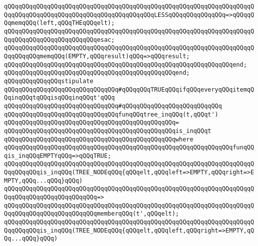 \verb|qQQqqQQqqQQqqQQqqQQqqQQqqQQqqQQqqQQqqQQqqQQqqQQqqQQqqQQqqQQqqQQqqQQqqQQqqQQqqQQqqQQqqQQqqQQqqQQqqQQqqQQqqQQqqQQqLESSqQQqqQQqqQQqqQQq=>qQQqqQQqmemqQQq(left,qQQqTHEqQQqelt);|\newline
\verb|qQQqqQQqqQQqqQQqqQQqqQQqqQQqqQQqqQQqqQQqqQQqqQQqqQQqqQQqqQQqqQQqqQQqqQQqqQQqqQQqqQQqqQQqqQQqqQQqesac;|\newline
\newline
\verb|qQQqqQQqqQQqqQQqqQQqqQQqqQQqqQQqqQQqqQQqqQQqqQQqqQQqqQQqqQQqqQQqqQQqqQQqqQQqqQQqmemqQQq(EMPTY,qQQqresult)qQQq=>qQQqresult;|\newline
\verb|qQQqqQQqqQQqqQQqqQQqqQQqqQQqqQQqqQQqqQQqqQQqqQQqqQQqqQQqqQQqqQQqend;|\newline
\verb|qQQqqQQqqQQqqQQqqQQqqQQqqQQqqQQqqQQqqQQqqQQqqQQqend;|\newline
\newline
\verb|qQQqqQQqqQQqqQQqstipulate|\newline
\newline
\verb|qQQqqQQqqQQqqQQqqQQqqQQqqQQqqQQq#qQQqqQQqTRUEqQQqifqQQqeveryqQQqitemqQQqinqQQqtqQQqisqQQqinqQQqt'qQQq|\newline
\verb|qQQqqQQqqQQqqQQqqQQqqQQqqQQqqQQq#qQQqqQQqqQQqqQQqqQQqqQQqqQQq|\newline
\verb|qQQqqQQqqQQqqQQqqQQqqQQqqQQqqQQqfunqQQqtree_inqQQq(t,qQQqt')|\newline
\verb|qQQqqQQqqQQqqQQqqQQqqQQqqQQqqQQqqQQqqQQqqQQqqQQq=|\newline
\verb|qQQqqQQqqQQqqQQqqQQqqQQqqQQqqQQqqQQqqQQqqQQqqQQqis_inqQQqt|\newline
\verb|qQQqqQQqqQQqqQQqqQQqqQQqqQQqqQQqqQQqqQQqqQQqqQQqwhere|\newline
\newline
\verb|qQQqqQQqqQQqqQQqqQQqqQQqqQQqqQQqqQQqqQQqqQQqqQQqqQQqqQQqqQQqqQQqfunqQQqis_inqQQqEMPTYqQQq=>qQQqTRUE;|\newline
\newline
\verb|qQQqqQQqqQQqqQQqqQQqqQQqqQQqqQQqqQQqqQQqqQQqqQQqqQQqqQQqqQQqqQQqqQQqqQQqqQQqqQQqis_inqQQq(TREE_NODEqQQq{qQQqelt,qQQqleft=>EMPTY,qQQqright=>EMPTY,qQQq...qQQq}qQQq)|\newline
\verb|qQQqqQQqqQQqqQQqqQQqqQQqqQQqqQQqqQQqqQQqqQQqqQQqqQQqqQQqqQQqqQQqqQQqqQQqqQQqqQQqqQQqqQQqqQQqqQQq=>|\newline
\verb|qQQqqQQqqQQqqQQqqQQqqQQqqQQqqQQqqQQqqQQqqQQqqQQqqQQqqQQqqQQqqQQqqQQqqQQqqQQqqQQqqQQqqQQqqQQqqQQqmemberqQQq(t',qQQqelt);|\newline
\newline
\verb|qQQqqQQqqQQqqQQqqQQqqQQqqQQqqQQqqQQqqQQqqQQqqQQqqQQqqQQqqQQqqQQqqQQqqQQqqQQqqQQqis_inqQQq(TREE_NODEqQQq{qQQqelt,qQQqleft,qQQqright=>EMPTY,qQQq...qQQq}qQQq)|\newline
